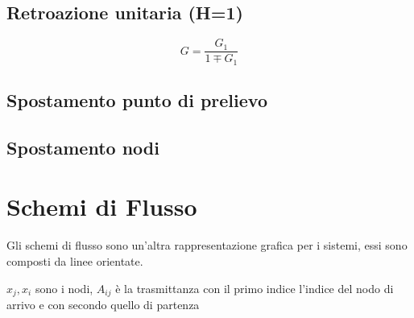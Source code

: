 \subsection{Retroazione unitaria (H=1)}
\begin{center}
	
\end{center}
\[
G = \frac{G_1}{1\mp G_1}
\]

\subsection{Spostamento punto di prelievo}
\begin{center}
	
\end{center}

\subsection{Spostamento nodi}
\begin{center}
	
\end{center}

\section{Schemi di Flusso}

Gli schemi di flusso sono un'altra rappresentazione grafica per i sistemi, essi sono composti da linee orientate.

\begin{center}
	
\end{center}

$ x_j, x_i $ sono i nodi, $ A_{ij} $ è la trasmittanza %
con il primo indice l'indice del nodo di arrivo e con secondo quello di partenza

